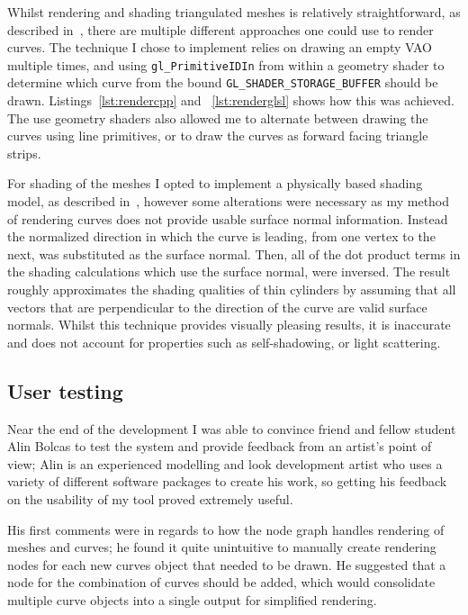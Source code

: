 \documentclass[]{acmsiggraph}
\begin{document}
Whilst rendering and shading triangulated meshes is relatively straightforward, as described in~\cite{objLoading}, there are multiple different approaches one could use to render curves. The technique I chose to implement relies on drawing an empty VAO multiple times, and using \texttt{gl\_PrimitiveIDIn} from within a geometry shader to determine which curve from the bound \texttt{GL\_SHADER\_STORAGE\_BUFFER} should be drawn. Listings~\ref{lst:rendercpp} and ~\ref{lst:renderglsl} shows how this was achieved. The use geometry shaders also allowed me to alternate between drawing the curves using line primitives, or to draw the curves as forward facing triangle strips. %

For shading of the meshes I opted to implement a physically based shading model, as described in~\cite{learnPBR}, however some alterations were necessary as my method of rendering curves does not provide usable surface normal information. Instead the normalized direction in which the curve is leading, from one vertex to the next, was substituted as the surface normal. Then, all of the dot product terms in the shading calculations which use the surface normal, were inversed. The result roughly approximates the shading qualities of thin cylinders by assuming that all vectors that are perpendicular to the direction of the curve are valid surface normals. Whilst this technique provides visually pleasing results, it is inaccurate and does not account for properties such as self-shadowing, or light scattering.

\subsection{User testing} \label{sec:usertesting}
Near the end of the development I was able to convince friend and fellow student Alin Bolcas to test the system and provide feedback from an artist's point of view; Alin is an experienced modelling and look development artist who uses a variety of different software packages to create his work, so getting his feedback on the usability of my tool proved extremely useful.

His first comments were in regards to how the node graph handles rendering of meshes and curves; he found it quite unintuitive to manually create rendering nodes for each new curves object that needed to be drawn. He suggested that a node for the combination of curves should be added, which would consolidate multiple curve objects into a single output for simplified rendering.
\end{document}
